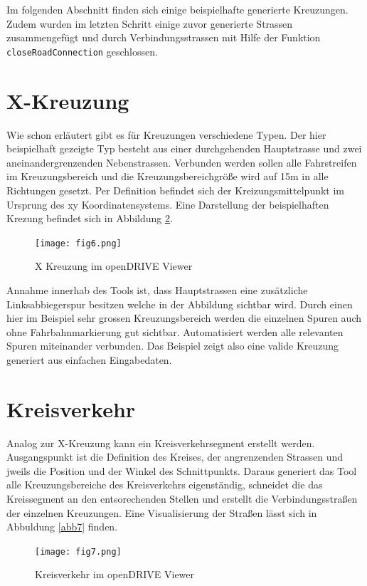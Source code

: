 Im folgenden Abschnitt finden sich einige beispielhafte generierte Kreuzungen. Zudem wurden im letzten Schritt einige zuvor generierte Strassen zusammengefügt und durch Verbindungsstrassen mit Hilfe der Funktion \texttt{closeRoadConnection} geschlossen. 

\section{X-Kreuzung}
Wie schon erläutert gibt es für Kreuzungen verschiedene Typen. Der hier beispielhaft gezeigte Typ besteht aus einer durchgehenden Hauptstrasse und zwei aneinandergrenzenden Nebenstrassen. Verbunden werden sollen alle Fahrstreifen im Kreuzungsbereich und die Kreuzungsbereichgröße wird auf 15m in alle Richtungen gesetzt. Per Definition befindet sich der Kreizungsmittelpunkt im Ursprung des xy Koordinatensystems. Eine Darstellung der beispielhaften Krezung befindet sich in Abbildung \ref{abb6}.

\begin{figure}[H]
	\flushleft
	\texttt{[image: fig6.png]}
	\caption{X Kreuzung im openDRIVE Viewer}
	\label{abb6}
\end{figure}

Annahme innerhab des Tools ist, dass Hauptstrassen eine zusätzliche Linksabbiegerspur besitzen welche in der Abbildung sichtbar wird. Durch einen hier im Beispiel sehr grossen Kreuzungsbereich werden die einzelnen Spuren auch ohne Fahrbahnmarkierung gut sichtbar. Automatisiert werden alle relevanten Spuren miteinander verbunden. Das Beispiel zeigt also eine valide Kreuzung generiert aus einfachen Eingabedaten.

\section{Kreisverkehr}
Analog zur X-Kreuzung kann ein Kreisverkehrsegment erstellt werden. Ausgangspunkt ist die Definition des Kreises, der angrenzenden Strassen und jweils die Position und der Winkel des Schnittpunkts. Daraus generiert das Tool alle Kreuzungsbereiche des Kreisverkehrs eigenständig, schneidet die das Kreissegment an den entsorechenden Stellen und erstellt die Verbindungsstraßen der einzelnen Kreuzungen. Eine Visualisierung der Straßen lässt sich in Abbuldung \ref{abb7} finden.

\begin{figure}[H]
	\flushleft
	\texttt{[image: fig7.png]}
	\caption{Kreisverkehr im openDRIVE Viewer}
	\label{abb6}
\end{figure}

